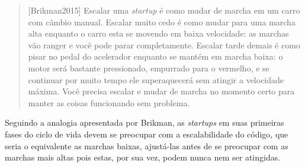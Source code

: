 \begin{quotation}[Brikman2015]
    Escalar uma \textit{startup} é como mudar de marcha em um carro com câmbio manual.
    Escalar muito cedo é como mudar para uma marcha alta enquanto o carro esta se movendo
    em baixa velocidade: as marchas vão ranger e você pode parar completamente. Escalar
    tarde demais é como pisar no pedal do acelerador enquanto se mantém em marcha baixa:
    o motor será bastante pressionado, empurrado para o vermelho, e se continuar por muito
    tempo ele superaquecerá sem atingir a velocidade máxima. Você precisa escalar e mudar
    de marcha no momento certo para manter as coisas funcionando sem problema.
\end{quotation}

Seguindo a analogia apresentada por Brikman, as \textit{startups} em suas primeiras fases
do ciclo de vida devem se preocupar com a escalabilidade do código, que seria o equivalente
as marchas baixas, ajustá-las antes de se preocupar com as marchas mais altas pois estas,
por sua vez, podem nunca nem ser atingidas.
